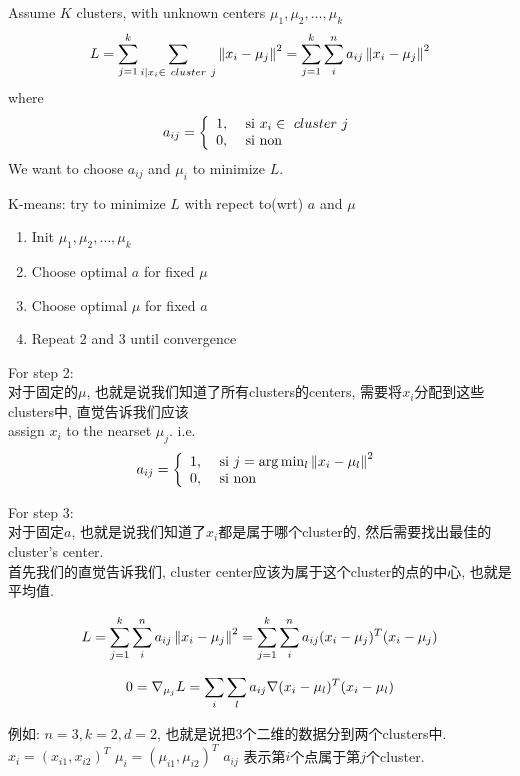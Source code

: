 \documentclass{article}
\begin{document}
Assume $K$ clusters, with unknown centers $\mu_1, \mu_2, \ldots, \mu_k$
$$
L
= \sum_{j = 1}^k \sum_{i | x_i \in\ cluster\ j}\left\Vert x_i - \mu_j\right\Vert^2
= \sum_{j = 1}^k \sum_i^n a_{ij}\left\Vert x_i - \mu_j\right\Vert^2
$$
where
$$
a_{ij} =
\left\{
  \begin{array}{ll}
    1, & \textrm{\ si } x_i \in\ cluster\ j\\
    0, & \textrm{ si non}
  \end{array}
\right.
$$
We want to choose $a_{ij}$ and $\mu_i$ to minimize $L$.

K-means: try to minimize $L$ with repect to(wrt) $a$ and $\mu$
\begin{enumerate}
\item Init $\mu_1, \mu_2, \ldots, \mu_k$
\item Choose optimal $a$ for fixed $\mu$
\item Choose optimal $\mu$ for fixed $a$
\item Repeat 2 and 3 until convergence
\end{enumerate}

For step 2:\\
对于固定的$\mu$, 也就是说我们知道了所有clusters的centers, 需要将$x_i$分配到这些clusters中, 直觉告诉我们应该\\
assign $x_i$ to the nearset $\mu_j$. i.e.
$$
a_{ij} =
\left\{
  \begin{array}{ll}
  1, & \textrm{\ si } j = \arg \min_l \left\Vert x_i - \mu_l\right\Vert^2\\
    0, & \textrm{ si non}
  \end{array}
\right.
$$

For step 3:\\
对于固定$a$, 也就是说我们知道了$x_i$都是属于哪个cluster的, 然后需要找出最佳的cluster's center.\\
首先我们的直觉告诉我们, cluster center应该为属于这个cluster的点的中心, 也就是平均值.

$$
\begin{aligned}
\end{aligned}
L
= \sum_{j = 1}^k \sum_i^n a_{ij}\left\Vert x_i - \mu_j\right\Vert^2
= \sum_{j = 1}^k \sum_i^n a_{ij}(x_i - \mu_j)^T (x_i - \mu_j)
$$

$$
0 = \nabla _{\mu_j}{L} = \sum_i \sum_l a_{ij} \nabla (x_i - \mu_l)^T (x_i - \mu_l)
$$

例如: $n=3, k=2, d=2$, 也就是说把3个二维的数据分到两个clusters中.\\
$x_i = (x_{i1}, x_{i2})^T$
$\mu_i = (\mu_{i1}, \mu_{i2})^T$
$a_{ij}$ 表示第$i$个点属于第$j$个cluster.
\end{document}
